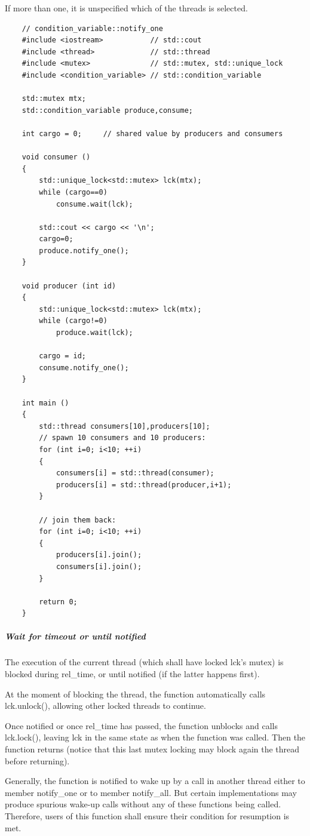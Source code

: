 \documentclass[UTF8,a4paper,12pt]{ctexbook}
\begin{document}
		If more than one, it is unspecified which of the threads is selected.
\begin{lstlisting}
	// condition_variable::notify_one
	#include <iostream>           // std::cout
	#include <thread>             // std::thread
	#include <mutex>              // std::mutex, std::unique_lock
	#include <condition_variable> // std::condition_variable
	
	std::mutex mtx;
	std::condition_variable produce,consume;
	
	int cargo = 0;     // shared value by producers and consumers
	
	void consumer () 
	{
		std::unique_lock<std::mutex> lck(mtx);
		while (cargo==0) 
			consume.wait(lck);
			
		std::cout << cargo << '\n';
		cargo=0;
		produce.notify_one();
	}
	
	void producer (int id) 
	{
		std::unique_lock<std::mutex> lck(mtx);
		while (cargo!=0) 
			produce.wait(lck);
			
		cargo = id;
		consume.notify_one();
	}
	
	int main ()
	{
		std::thread consumers[10],producers[10];
		// spawn 10 consumers and 10 producers:
		for (int i=0; i<10; ++i) 
		{
			consumers[i] = std::thread(consumer);
			producers[i] = std::thread(producer,i+1);
		}
		
		// join them back:
		for (int i=0; i<10; ++i) 
		{
			producers[i].join();
			consumers[i].join();
		}
		
		return 0;
	}
\end{lstlisting}
		\subparagraph{Wait for timeout or until notified}
			The execution of the current thread (which shall have locked lck's mutex) is blocked during rel\_time, or until notified (if the latter happens first).
			
			At the moment of blocking the thread, the function automatically calls lck.unlock(), allowing other locked threads to continue.
			
			Once notified or once rel\_time has passed, the function unblocks and calls lck.lock(), leaving lck in the same state as when the function was called. Then the function returns (notice that this last mutex locking may block again the thread before returning).
			
			Generally, the function is notified to wake up by a call in another thread either to member notify\_one or to member notify\_all. But certain implementations may produce spurious wake-up calls without any of these functions being called. Therefore, users of this function shall ensure their condition for resumption is met.
			
\end{document}
